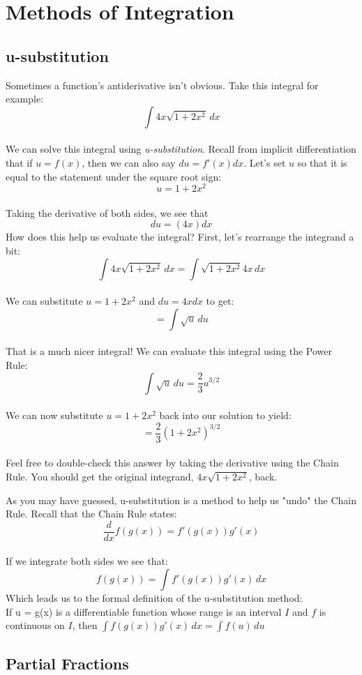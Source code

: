 \chapter{Methods of Integration}

\section{u-substitution}
Sometimes a function's antiderivative isn't obvious. Take this 
integral for example: $$\int 4x \sqrt{1 + 2x^2}\, dx$$\\ We can solve 
this integral using \textit{u-substitution}. Recall from implicit 
differentiation that if $u = f(x)$, then we can also say $du = 
f'(x) dx$. Let's set $u$ so that it is equal to the statement under 
the square root sign: $$u = 1 + 2x^2$$\\ Taking the derivative of both 
sides, we see that $$du = (4x) dx$$ How does this help us evaluate 
the integral? First, let's rearrange the integrand a bit: $$\int 4x 
\sqrt{1 + 2x^2}\,dx = \int \sqrt{1 + 2x^2} 4x\,dx$$\\ We can substitute 
$u = 1 + 2x^2$ and $du = 4x dx$ to get: $$= \int \sqrt{u}\,du$$\\ That 
is a much nicer integral! We can evaluate this integral using the 
Power Rule: $$\int \sqrt{u}\,du = \frac{2}{3}u^{3/2}$$\\ We can now 
substitute $u = 1 + 2x^2$ back into our solution to yield: $$= 
\frac{2}{3}(1 + 2x^2)^{3/2}$$\\ Feel free to double-check this answer 
by taking the derivative using the Chain Rule. You should get the 
original integrand, $4x \sqrt{1 + 2x^2}$, back. 

As you may have guessed, u-substitution is a method to help us "undo" 
the Chain Rule. Recall that the Chain Rule states: $$\frac{d}{dx}
f(g(x)) = f'(g(x))g'(x)$$\\ If we integrate both sides we see that: 
$$f(g(x)) = \int f'(g(x))g'(x)\,dx$$ Which leads us to the formal 
definition of the u-substitution method:\\

If u = g(x) is a differentiable function whose range is an interval 
$I$ and $f$ is continuous on $I$, then $\int f(g(x))g'(x)\,dx = \int 
f(u)\,du$

\section{Partial Fractions}

